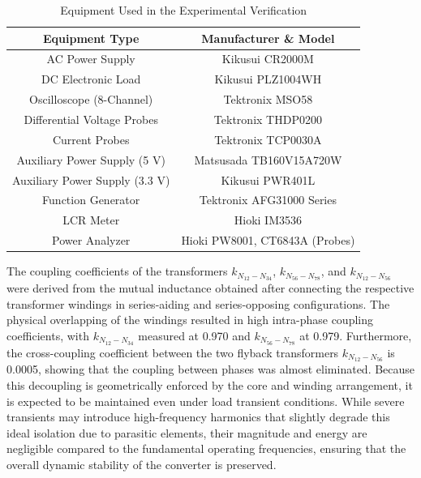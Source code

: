 \documentclass[lettersize,journal]{IEEEtran}
\begin{document}
\begin{table}[t!] %
    \caption{Equipment Used in the Experimental Verification}
    \centering
    \footnotesize
    \setlength{\tabcolsep}{3pt}
    \begin{tabular}{cc}
        \hline
        \textbf{Equipment Type} & \textbf{Manufacturer \& Model} \\
        \hline \hline
        AC Power Supply & Kikusui CR2000M \\
        DC Electronic Load & Kikusui PLZ1004WH \\
        Oscilloscope (8-Channel) & Tektronix MSO58 \\
        Differential Voltage Probes & Tektronix THDP0200 \\
        Current Probes & Tektronix TCP0030A \\
        Auxiliary Power Supply (5 V) & Matsusada TB160V15A720W \\
        Auxiliary Power Supply (3.3 V) & Kikusui PWR401L \\
        Function Generator & Tektronix AFG31000 Series \\
        LCR Meter & Hioki IM3536 \\
        {\color{red}Power Analyzer} & {\color{red}Hioki PW8001,  CT6843A (Probes)}\\
        \hline
    \end{tabular}
    \label{tab:equipment}
\end{table}

The coupling coefficients of the transformers $k_{N_{12}-N_{34}}$, $k_{N_{56}-N_{78}}$, and $k_{N_{12}-N_{56}}$ were derived from the mutual inductance obtained after connecting the respective transformer windings in series-aiding and series-opposing configurations. The physical overlapping of the windings resulted in high intra-phase coupling coefficients, with $k_{N_{12}-N_{34}}$ measured at 0.970 and $k_{N_{56}-N_{78}}$ at 0.979. Furthermore, the cross-coupling coefficient between the two flyback transformers $k_{N_{12}-N_{56}}$ is 0.0005, showing that the coupling between phases was almost eliminated. Because this decoupling is geometrically enforced by the core and winding arrangement, it is expected to be maintained even under load transient conditions. While severe transients may introduce high-frequency harmonics that slightly degrade this ideal isolation due to parasitic elements, their magnitude and energy are negligible compared to the fundamental operating frequencies, ensuring that the overall dynamic stability of the converter is preserved.
\end{document}
